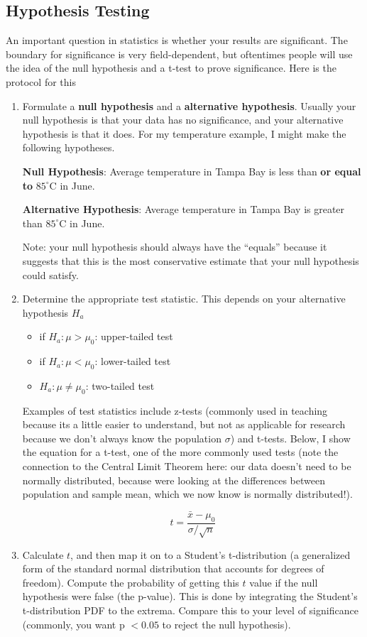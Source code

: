 \documentclass{article}
\begin{document}
\subsection{Hypothesis Testing}
An important question in statistics is whether your results are significant. The boundary for significance is very field-dependent, but oftentimes people will use the idea of the null hypothesis and a t-test to prove significance. Here is the protocol for this
\begin{enumerate}
\item\label{item:4} Formulate a \textbf{null hypothesis} and a \textbf{alternative hypothesis}. Usually your null hypothesis is that your data has no significance, and your alternative hypothesis is that it does. For my temperature example, I might make the following hypotheses.

  \textbf{Null Hypothesis}: Average temperature in Tampa Bay is less than \textbf{or equal to} $85^{\circ}$C in June.

  \textbf{Alternative Hypothesis}: Average temperature in Tampa Bay is greater than $85^{\circ}$C in June.

  Note: your null hypothesis should always have the ``equals'' because it suggests that this is the most conservative estimate that your null hypothesis could satisfy.
  
\item Determine the appropriate test statistic. This depends on your alternative hypothesis $H_a$

\begin{itemize}
\item if $H_a:\mu>\mu_0$: upper-tailed test
\item if $H_a:\mu<\mu_0$: lower-tailed test
\item $H_a:\mu\neq\mu_0$: two-tailed test
\end{itemize}


Examples of test statistics include z-tests (commonly used in teaching because its a little easier to understand, but not as applicable for research because we don't always know the population $\sigma$) and t-tests. Below, I show the equation for a t-test, one of the more commonly used tests (note the connection to the Central Limit Theorem here: our data doesn't need to be normally distributed, because were looking at the differences between population and sample mean, which we now know is normally distributed!). 

\begin{equation}
\label{eq:15}
t = \frac{\bar{x}-\mu_0}{\sigma / \sqrt{n}}
\end{equation}

\item Calculate $t$, and then map it on to a Student's t-distribution (a generalized form of the standard normal distribution that accounts for degrees of freedom). Compute the probability of getting this $t$ value if the null hypothesis were false (the p-value). This is done by integrating the Student's t-distribution PDF to the extrema. Compare this to your level of significance (commonly, you want p $< 0.05$ to reject the null hypothesis).
 
\end{enumerate}  
\end{document}
